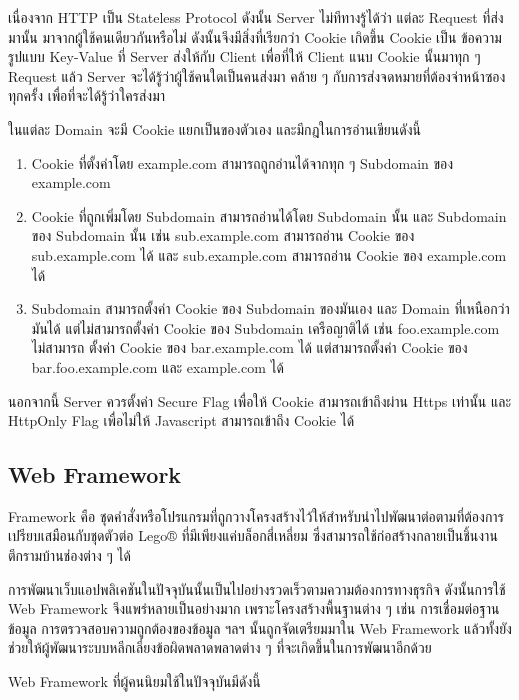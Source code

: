 เนื่องจาก HTTP เป็น Stateless Protocol ดังนั้น Server ไม่ทีทางรู้ได้ว่า แต่ละ Request ที่ส่งมานั้น มาจากผู้ใช้คนเดียวกันหรือไม่ ดังนั้นจึงมีสิ่งที่เรียกว่า Cookie เกิดขึ้น Cookie เป็น ข้อความรูปแบบ Key-Value ที่ Server ส่งให้กับ Client เพื่อที่ให้ Client แนบ Cookie นั้นมาทุก ๆ Request แล้ว Server จะได้รู้ว่าผู้ใช้คนใดเป็นคนส่งมา คล้าย ๆ กับการส่งจดหมายที่ต้องจ่าหน้าซองทุกครั้ง เพื่อที่จะได้รู้ว่าใครส่งมา \cite{https://developer.mozilla.org/en-US/docs/Web/HTTP/Cookies}

ในแต่ละ Domain จะมี Cookie แยกเป็นของตัวเอง และมีกฎในการอ่านเขียนดังนี้

\begin{enumerate}
	\item Cookie ที่ตั้งค่าโดย example.com สามารถถูกอ่านได้จากทุก ๆ Subdomain ของ example.com
	\item Cookie ที่ถูกเพิ่มโดย Subdomain สามารถอ่านได้โดย Subdomain นั้น และ Subdomain ของ Subdomain นั้น เช่น sub.example.com สามารถอ่าน Cookie ของ sub.example.com ได้ และ sub.example.com สามารถอ่าน Cookie ของ example.com ได้
	\item Subdomain สามารถตั้งค่า Cookie ของ Subdomain ของมันเอง และ Domain ที่เหนือกว่ามันได้ แต่ไม่สามารถตั้งค่า Cookie ของ Subdomain เครือญาติได้ เช่น foo.example.com ไม่สามารถ ตั้งค่า Cookie ของ bar.example.com ได้ แต่สามารถตั้งค่า Cookie ของ bar.foo.example.com และ example.com ได้
\end{enumerate}

นอกจากนี้ Server ควรตั้งค่า Secure Flag เพื่อให้ Cookie สามารถเข้าถึงผ่าน Https เท่านั้น และ HttpOnly Flag เพื่อไม่ให้ Javascript สามารถเข้าถึง Cookie ได้

\subsection{Web Framework}

Framework คือ ชุดคำสั่งหรือโปรแกรมที่ถูกวางโครงสร้างไว้ให้สำหรับนำไปพัฒนาต่อตามที่ต้องการ เปรียบเสมือนกับชุดตัวต่อ Lego® ที่มีเพียงแค่บล็อกสี่เหลี่ยม ซึ่งสามารถใช้ก่อสร้างกลายเป็นชิ้นงานตึกรามบ้านช่องต่าง ๆ ได้

การพัฒนาเว็บแอปพลิเคชันในปัจจุบันนั้นเป็นไปอย่างรวดเร็วตามความต้องการทางธุรกิจ ดังนั้นการใช้ Web Framework  จึงแพร่หลายเป็นอย่างมาก เพราะโครงสร้างพื้นฐานต่าง ๆ เช่น การเชื่อมต่อฐานข้อมูล การตรวจสอบความถูกต้องของข้อมูล ฯลฯ นั้นถูกจัดเตรียมมาใน Web Framework แล้วทั้งยังช่วยให้ผู้พัฒนาระบบหลีกเลี่ยงข้อผิดพลาดพลาดต่าง ๆ ที่จะเกิดขึ้นในการพัฒนาอีกด้วย

Web Framework ที่ผู้คนนิยมใช้ในปัจจุบันมีดังนี้

